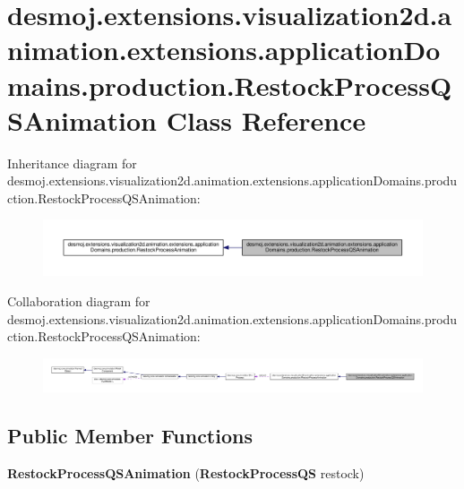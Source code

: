 \section{desmoj.\-extensions.\-visualization2d.\-animation.\-extensions.\-application\-Domains.\-production.\-Restock\-Process\-Q\-S\-Animation Class Reference}
\label{classdesmoj_1_1extensions_1_1visualization2d_1_1animation_1_1extensions_1_1application_domains_1e43e646478fd58606c59f502334aebfd}


Inheritance diagram for desmoj.\-extensions.\-visualization2d.\-animation.\-extensions.\-application\-Domains.\-production.\-Restock\-Process\-Q\-S\-Animation\-:
\nopagebreak
\begin{figure}[H]
\begin{center}
\leavevmode
\includegraphics[width=350pt]{classdesmoj_1_1extensions_1_1visualization2d_1_1animation_1_1extensions_1_1application_domains_1e9d55e767f33b489a89010a9baead280}
\end{center}
\end{figure}


Collaboration diagram for desmoj.\-extensions.\-visualization2d.\-animation.\-extensions.\-application\-Domains.\-production.\-Restock\-Process\-Q\-S\-Animation\-:
\nopagebreak
\begin{figure}[H]
\begin{center}
\leavevmode
\includegraphics[width=350pt]{classdesmoj_1_1extensions_1_1visualization2d_1_1animation_1_1extensions_1_1application_domains_1c6593055a19c521bd99f739bb341c2d3}
\end{center}
\end{figure}
\subsection*{Public Member Functions}
\begin{DoxyCompactItemize}
\item 
{\bfseries Restock\-Process\-Q\-S\-Animation} ({\bf Restock\-Process\-Q\-S} restock)\label{classdesmoj_1_1extensions_1_1visualization2d_1_1animation_1_1extensions_1_1application_domains_1e43e646478fd58606c59f502334aebfd_a7faa5a23f22c53d5da12c6c85689c90f}

\end{DoxyCompactItemize}
